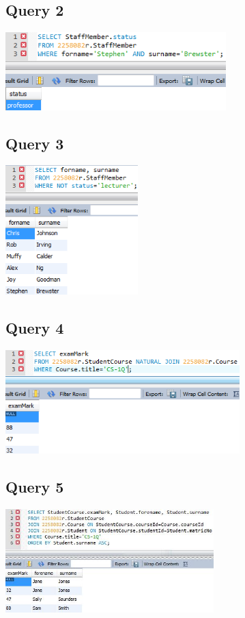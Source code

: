 \documentclass[12pt]{article}
\begin{document}
\subsection{Query 2}
\includegraphics[width=\linewidth,height=3cm,keepaspectratio]{query/Query2}
\subsection{Query 3}
\includegraphics[width=\linewidth,height=5cm,keepaspectratio]{query/Query3}
\subsection{Query 4}
\includegraphics[width=\linewidth,height=4cm,keepaspectratio]{query/Query4}
\subsection{Query 5}
\includegraphics[width=\linewidth,height=4cm,keepaspectratio]{query/Query5}
\end{document}
